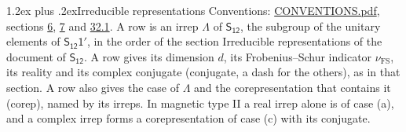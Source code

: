 \documentclass[10pt,a4paper]{article}
\makeatletter
\renewcommand\section{\@startsection{section}{1}{\z@}{-3ex plus -1ex minus -.2ex}%
  {1.2ex plus .2ex}{\normalfont\large\sffamily\bfseries\color{parttitle}}}
\numberwithin{equation}{section}
\newcommand{\grp}[1]{\mathsf{#1}}
\newcommand{\fsind}{\nu_{\mathrm{FS}}}
\makeatother
\begin{document}
\section{Irreducible representations}\label{s:irreps}
Conventions: \href{../../CONVENTIONS.pdf}{CONVENTIONS.pdf}, sections \href{../../../rotation/CONVENTIONS.pdf\#conv.6}{6}, \href{../../../rotation/CONVENTIONS.pdf\#conv.7}{7} and \href{../../CONVENTIONS.pdf\#conv.32.1}{32.1}.
\leavevmode\label{n:irrep.Delta}A row is an irrep $\Lambda$ of $\grp{S_{12}}$, the subgroup of the unitary elements of $\grp{S_{12}1'}$, in the order of the section Irreducible representations of the document of \href{../../../rotation/data/pdf/S12.pdf}{$\grp{S_{12}}$}. \label{n:index.dimension}\label{n:index.frobenius}\label{n:head.irrep}\label{n:head.reality}\label{n:head.conjugate}A row gives its dimension $d$, its Frobenius--Schur indicator $\fsind$, its reality and its complex conjugate (conjugate, a dash for the others), as in that section. \label{n:head.case.corep}\label{n:head.corep}A row also gives the case of $\Lambda$ and the corepresentation that contains it (corep), named by its irreps. In magnetic type II a real irrep alone is of case (a), and a complex irrep forms a corepresentation of case (c) with its conjugate.
\setlength{\emergencystretch}{2em}\par\setlength{\emergencystretch}{0pt}
\end{document}
